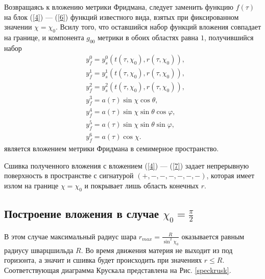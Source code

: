 \documentclass[12pt]{article}
\begin{document}
Возвращаясь к вложению метрики Фридмана, следует заменить функцию $f(\tau)$ на блок (\ref{4}) --- (\ref{6}) функций известного вида, взятых при фиксированном значении $\chi = \chi_0$. Всилу того, что оставшийся набор функций вложения совпадает на границе, и компонента $g_{00}$ метрики в обоих областях равна $1$, получившийся набор
\begin{align}
	&y^0_f = y^0_s(t(\tau, \chi_0), r(\tau, \chi_0)), \\
	&y^1_f = y^1_s(t(\tau, \chi_0), r(\tau, \chi_0)), \\
	&y^2_f = y^2_s(t(\tau, \chi_0), r(\tau, \chi_0)), \\
	&y^3_f = a(\tau) \sin{\chi} \cos{\theta}, \\
	&y^4_f = a(\tau) \sin{\chi} \sin{\theta} \cos{\varphi}, \\
	&y^5_f = a(\tau) \sin{\chi} \sin{\theta} \sin{\varphi}, \\
	&y^6_f = a(\tau) \cos{\chi}.
\end{align}
является вложением метрики Фридмана в семимерное пространство. 

Сшивка полученного вложения с вложением (\ref{4}) --- (\ref{7}) задает непрерывную поверхность в пространстве с сигнатурой $(+, -, -, -, -, -, -)$, которая имеет излом на границе  $\chi = \chi_0$ и покрывает лишь область конечных $r$. 

\subsection{ Построение вложения в случае $\chi_0 = \frac{\pi}{2}$}

В этом случае максимальный радиус шара $r_{max} = \frac{R}{\sin^2{\chi_0}}$ оказывается равным радиусу шварцшильда $R$. Во время движения материя не выходит из под горизонта, а значит и сшивка будет происходить при значениях $r \leqslant R$. Соответствующая диаграмма Крускала представлена на Рис. \ref{speckrusk}.
\end{document}
